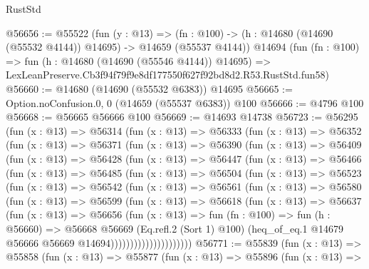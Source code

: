 \begin{lexlean}{RustStd}
\begin{coremodule}
@56656 := @55522
    (fun (y : @13) =>
    (fn : @100) -> (h : @14680 (@14690 (@55532 @4144)) @14695) -> @14659 (@55537 @4144))
    @14694
    (fun (fn : @100) =>
    fun (h : @14680 (@14690 (@55546 @4144)) @14695) =>
    LexLeanPreserve.Cb3f94f79f9e8df177550f627f92bd8d2.R53.RustStd.fun58)
@56660 := @14680 (@14690 (@55532 @6383)) @14695
@56665 := Option.noConfusion.{0, 0} (@14659 (@55537 @6383)) @100
@56666 := @4796 @100
@56668 := @56665 @56666 @100
@56669 := @14693 @14738
@56723 := @56295
    (fun (x : @13) =>
    @56314
      (fun (x : @13) =>
      @56333
        (fun (x : @13) =>
        @56352
          (fun (x : @13) =>
          @56371
            (fun (x : @13) =>
            @56390
              (fun (x : @13) =>
              @56409
                (fun (x : @13) =>
                @56428
                  (fun (x : @13) =>
                  @56447
                    (fun (x : @13) =>
                    @56466
                      (fun (x : @13) =>
                      @56485
                        (fun (x : @13) =>
                        @56504
                          (fun (x : @13) =>
                          @56523
                            (fun (x : @13) =>
                            @56542
                              (fun (x : @13) =>
                              @56561
                                (fun (x : @13) =>
                                @56580
                                  (fun (x : @13) =>
                                  @56599
                                    (fun (x : @13) =>
                                    @56618
                                      (fun (x : @13) =>
                                      @56637
                                        (fun (x : @13) =>
                                        @56656
                                          (fun (x : @13) =>
                                          fun (fn : @100) =>
                                          fun (h : @56660) =>
                                          @56668
                                            @56669
                                            (Eq.refl.{2} (Sort 1) @100)
                                            (heq_of_eq.{1}
                                              @14679
                                              @56666
                                              @56669
                                              @14694)))))))))))))))))))))
@56771 := @55839
    (fun (x : @13) =>
    @55858
      (fun (x : @13) =>
      @55877
        (fun (x : @13) =>
        @55896
          (fun (x : @13) =>

\end{coremodule}
\end{lexlean}
